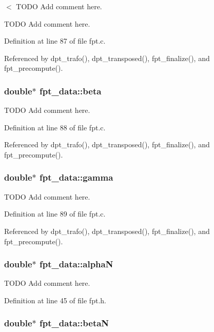 $<$ TODO Add comment here. 

TODO Add comment here. 

Definition at line 87 of file fpt.c.

Referenced by dpt\_\-trafo(), dpt\_\-transposed(), fpt\_\-finalize(), and fpt\_\-precompute().\hypertarget{structfpt__data_ba9cfecd384591c476464842ed5ddb2d}{
\subsubsection{\setlength{\rightskip}{0pt plus 5cm}double$\ast$ {\bf fpt\_\-data::beta}}}
\label{structfpt__data_ba9cfecd384591c476464842ed5ddb2d}


TODO Add comment here. 



Definition at line 88 of file fpt.c.

Referenced by dpt\_\-trafo(), dpt\_\-transposed(), fpt\_\-finalize(), and fpt\_\-precompute().\hypertarget{structfpt__data_44795aeed3218709fa139025fcd22451}{
\subsubsection{\setlength{\rightskip}{0pt plus 5cm}double$\ast$ {\bf fpt\_\-data::gamma}}}
\label{structfpt__data_44795aeed3218709fa139025fcd22451}


TODO Add comment here. 



Definition at line 89 of file fpt.c.

Referenced by dpt\_\-trafo(), dpt\_\-transposed(), fpt\_\-finalize(), and fpt\_\-precompute().\hypertarget{structfpt__data_eafd070ebb2e7c345750303d34a68890}{
\subsubsection{\setlength{\rightskip}{0pt plus 5cm}double$\ast$ {\bf fpt\_\-data::alphaN}}}
\label{structfpt__data_eafd070ebb2e7c345750303d34a68890}


TODO Add comment here. 



Definition at line 45 of file fpt.h.\hypertarget{structfpt__data_eace6f72b465a9bd2d8c399c69b7d9a9}{
\subsubsection{\setlength{\rightskip}{0pt plus 5cm}double$\ast$ {\bf fpt\_\-data::betaN}}}
\label{structfpt__data_eace6f72b465a9bd2d8c399c69b7d9a9}


